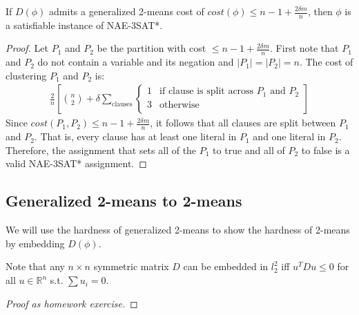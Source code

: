 \begin{lemma} \label{satisfiable-instance}
If $D(\phi)$  admits a generalized 2-means cost of $cost(\phi) \le n -
1 + \frac{2\delta m}{n}$, then $\phi$ is a satisfiable instance of
NAE-3SAT*. 
\end{lemma}

\begin{proof}
Let $P_1$ and $P_2$ be the partition with cost $\le n - 1 +
\frac{2\delta m}{n}$.  First note that $P_1$ and $P_2$ do not contain
a variable and its negation and $|P_1| = |P_2| = n$.  The cost of
clustering $P_1$ and $P_2$ is:
\begin{align*}
  \frac{2}{n} \left[ {n \choose 2} + \delta \sum_{\textrm{clauses}} 
  \begin{cases}
    1 & \textrm{if clause is split across $P_1$ and $P_2$}\\  
    3 & \textrm{otherwise} \\ 
  \end{cases}\right]
\end{align*}
Since $cost(P_1, P_2) \le n - 1 + \frac{2\delta m}{n}$, it follows that all
clauses are split between $P_1$ and $P_2$.  That is, every clause has
at least one literal in $P_1$ and one literal in $P_2$.  Therefore,
the assignment that sets all of the $P_1$ to true and all of $P_2$ to
false is a valid NAE-3SAT* assignment. 
\end{proof}



\subsection{Generalized 2-means to 2-means}
We will use the hardness of generalized 2-means to show the hardness
of 2-means by embedding $D(\phi)$.
\begin{fact}
Note that any $n \times n$ symmetric matrix $D$ can be embedded in
$l_2^2$ iff $u^TDu  \le 0$ for all $u \in \mathbb{R}^n$ s.t. $\sum u_i
= 0$. 
\end{fact}
\begin{proof}[Proof as homework exercise]
\end{proof}

